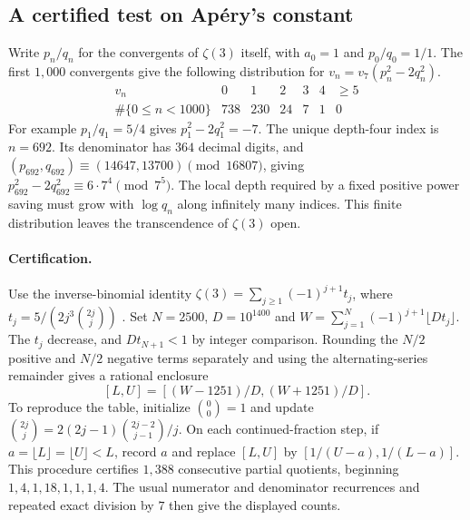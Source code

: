 \documentclass[11pt,a4paper]{article}
\begin{document}
\subsection{A certified test on Ap\'ery's constant}\label{sec:aperytest}
Write $p_n/q_n$ for the convergents of $\zeta(3)$ itself, with $a_0=1$
and $p_0/q_0=1/1$. The first $1{,}000$ convergents give the following
distribution for $v_n=v_7(p_n^2-2q_n^2)$.
\[
\begin{array}{c|rrrrrr}
 v_n&0&1&2&3&4&\ge5\\ \hline
 \#\{0\le n<1000\}&738&230&24&7&1&0
\end{array}
\]
For example $p_1/q_1=5/4$ gives $p_1^2-2q_1^2=-7$.
The unique depth-four index is $n=692$. Its denominator has $364$
decimal digits, and $(p_{692},q_{692})\equiv(14647,13700)\pmod{16807}$, giving
$p_{692}^2-2q_{692}^2\equiv6\cdot7^4\pmod{7^5}$.
The local depth required by a fixed positive power saving must grow with
$\log q_n$ along infinitely many indices. This finite distribution leaves
the transcendence of $\zeta(3)$ open.

\paragraph{Certification.}
Use the inverse-binomial identity
$\zeta(3)=\sum_{j\ge1}(-1)^{j+1}t_j$, where
$t_j=5/(2j^3\binom{2j}{j})$
\cite[Eq.~(1.2)]{aperybb}. Set $N=2500$, $D=10^{1400}$ and
$W=\sum_{j=1}^N(-1)^{j+1}\lfloor Dt_j\rfloor$.
The $t_j$ decrease, and $Dt_{N+1}<1$ by integer comparison.
Rounding the $N/2$ positive and $N/2$ negative terms separately and
using the alternating-series remainder gives a rational enclosure
\[
 [L,U]=[(W-1251)/D,(W+1251)/D].
\]
To reproduce the table, initialize $\binom00=1$ and update
$\binom{2j}{j}=2(2j-1)\binom{2j-2}{j-1}/j$. On each continued-fraction
step, if $a=\lfloor L\rfloor=\lfloor U\rfloor<L$, record $a$ and
replace $[L,U]$ by $[1/(U-a),1/(L-a)]$. This procedure certifies
$1{,}388$ consecutive partial quotients, beginning $1,4,1,18,1,1,1,4$.
The usual numerator and denominator recurrences and repeated exact
division by $7$ then give the displayed counts.
\end{document}
